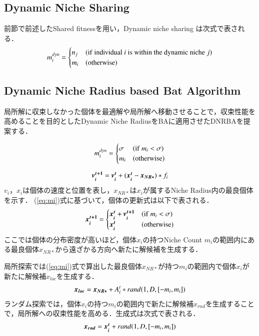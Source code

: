 \documentclass[twocolumn, a4paper]{UECIEresume}
\begin{document}
\subsection{Dynamic Niche Sharing}
\label{ss:dns}
前節で前述したShared fitnessを用い，Dynamic niche sharing \cite{DNS} は次式で表される．
\begin{equation}
\label{eq:dns}
m_i^{dyn}=\begin{cases}
n_j & ({\rm if \ individual}\ i {\rm \ is \ within \ the \ dynamic \ niche }\ j) \\
m_i & ({\rm otherwise})
\end{cases}
\end{equation}

\subsection{Dynamic Niche Radius based Bat Algorithm}
局所解に収束しなかった個体を最適解や局所解へ移動させることで，収束性能を高めることを目的としたDynamic Niche RadiusをBAに適用させたDNRBAを提案する．

\begin{equation}
\label{eq:mi}
m_i^{dyn}=\begin{cases}
\sigma & ({\rm if } \ m_i < \sigma) \\
m_i & ({\rm otherwise})
\end{cases}
\end{equation}

\begin{equation}
\label{eq:dnrba-vi}
 \mbox{\boldmath $v_i^{t+1}$} = \mbox{\boldmath $v_i^t$} + (\mbox{\boldmath $x_i^t$}-\mbox{\boldmath $x_{NR*}$})*f_i
\end{equation}
$v_i$，$x_i$は個体の速度と位置を表し，$x_{NR*}$は$x_i$が属するNiche Radius内の最良個体を示す．
(\ref{eq:mi})式に基づいて，個体の更新式は以下で表される．
\begin{equation}
\label{eq:dnrba-xi}
\mbox{\boldmath $x_i^{t+1}$}=\begin{cases}
\mbox{\boldmath $x_i^t$}+\mbox{\boldmath $v_i^{t+1}$} & ({\rm if} \ m_i < \sigma) \\
\mbox{\boldmath $x_i^t$} & ({\rm otherwise})
\end{cases}
\end{equation}
ここでは個体の分布密度が高いほど，個体$x_i$の持つNiche Count $m_i$の範囲内にある最良個体$x_{NR*}$から遠ざかる方向へ新たに解候補を生成する．

局所探索では(\ref{eq:mi})式で算出した最良個体$x_{NR*}$が持つ$m_i$の範囲内で個体$x_i$が新たに解候補$x_{loc}$を生成する．
\begin{equation}
\label{eq:dnrloc}
\mbox{\boldmath $x_{loc}$}=\mbox{\boldmath $x_{NR*}$} + A_i^t*rand(1,D,[-m_i, m_i])
\end{equation}
ランダム探索では，個体$x_i$の持つ$m_i$の範囲内で新たに解候補$x_{rnd}$を生成することで，局所解への収束性能を高める．生成式は次式で表される．
\begin{equation}
\label{eq:dnrrnd}
\mbox{\boldmath $x_{rnd}$}=\mbox{\boldmath $x_i^t$} + rand(1,D,[-m_i, m_i])
\end{equation}
\end{document}
